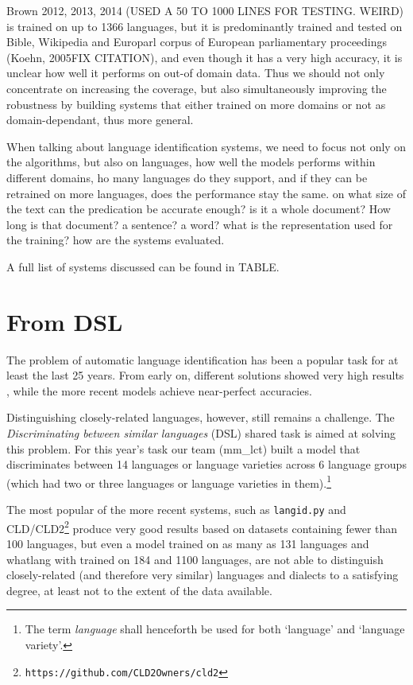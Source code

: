 Brown 2012, 2013, 2014 (USED A 50 TO 1000 LINES FOR TESTING. WEIRD) is trained on up to 1366 languages, but it is predominantly trained and tested on Bible, Wikipedia and Europarl corpus of European
parliamentary proceedings (Koehn, 2005FIX CITATION), and even though it has a very high accuracy, it is unclear how well it performs on out-of domain data. Thus we should not only concentrate on increasing the coverage, but also simultaneously  improving the robustness by building systems that either trained on more domains or not as domain-dependant, thus more general. 




When talking about language identification systems, we need to focus not only on the algorithms, but also on languages, how well the models performs within different domains, ho many languages do they support, and if they can be retrained on more languages, does the performance stay the same. on what size of the text can the predication be accurate enough? is it a whole document? How long is that document? a sentence? a word?
what is the representation used for the training? how are the systems evaluated.

A full list of systems discussed can be found in TABLE.
\section{From DSL}
\label{intro}

The problem of automatic language identification has been a popular task for at least the last 25 years. From early on, different solutions showed very high results \parencite{cavnar1994n,dunning1994statistical}, while the more recent models achieve near-perfect accuracies.

Distinguishing closely-related languages, however, still remains a challenge. The \textit{Discriminating between similar languages} (DSL) shared task \parencite{vardial2017report} is aimed at solving this problem. For this year's task our team (mm\_lct) built a model that discriminates between 14 languages or language varieties across 6 language groups (which had two or three languages or language varieties in them).\footnote{The term \textit{language} shall henceforth be used for both `language' and `language variety'.}

The most popular of the more recent systems, such as \texttt{langid.py} \parencite{lui2012langid} and CLD/CLD2\footnote{\texttt{https://github.com/CLD2Owners/cld2}} produce very good results based on datasets containing fewer than 100 languages, but even a model trained on as many as 131 languages \parencite{kocmi2017lanidenn} and whatlang \parencite{brown2013selecting} with trained on 184 and 1100 languages, are not able to distinguish closely-related (and therefore very similar) languages and dialects to a satisfying degree, at least not to the extent of the data available.

